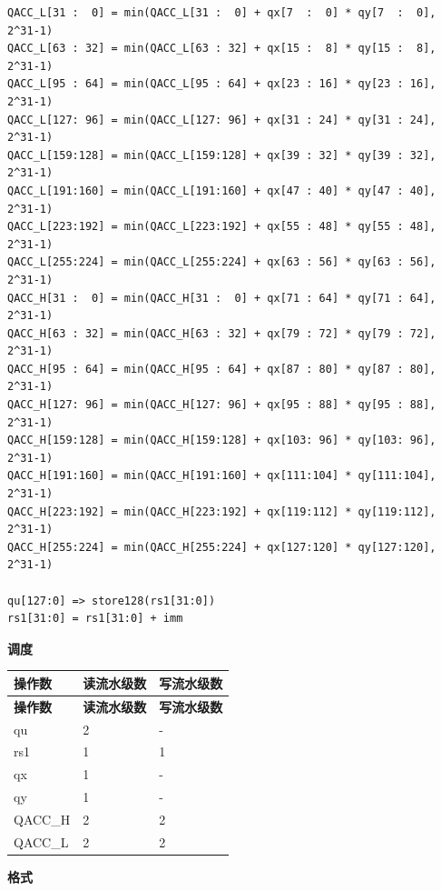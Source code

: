 \begin{lstlisting}
QACC_L[31 :  0] = min(QACC_L[31 :  0] + qx[7  :  0] * qy[7  :  0], 2^31-1)
QACC_L[63 : 32] = min(QACC_L[63 : 32] + qx[15 :  8] * qy[15 :  8], 2^31-1)
QACC_L[95 : 64] = min(QACC_L[95 : 64] + qx[23 : 16] * qy[23 : 16], 2^31-1)
QACC_L[127: 96] = min(QACC_L[127: 96] + qx[31 : 24] * qy[31 : 24], 2^31-1)
QACC_L[159:128] = min(QACC_L[159:128] + qx[39 : 32] * qy[39 : 32], 2^31-1)
QACC_L[191:160] = min(QACC_L[191:160] + qx[47 : 40] * qy[47 : 40], 2^31-1)
QACC_L[223:192] = min(QACC_L[223:192] + qx[55 : 48] * qy[55 : 48], 2^31-1)
QACC_L[255:224] = min(QACC_L[255:224] + qx[63 : 56] * qy[63 : 56], 2^31-1)
QACC_H[31 :  0] = min(QACC_H[31 :  0] + qx[71 : 64] * qy[71 : 64], 2^31-1)
QACC_H[63 : 32] = min(QACC_H[63 : 32] + qx[79 : 72] * qy[79 : 72], 2^31-1)
QACC_H[95 : 64] = min(QACC_H[95 : 64] + qx[87 : 80] * qy[87 : 80], 2^31-1)
QACC_H[127: 96] = min(QACC_H[127: 96] + qx[95 : 88] * qy[95 : 88], 2^31-1)
QACC_H[159:128] = min(QACC_H[159:128] + qx[103: 96] * qy[103: 96], 2^31-1)
QACC_H[191:160] = min(QACC_H[191:160] + qx[111:104] * qy[111:104], 2^31-1)
QACC_H[223:192] = min(QACC_H[223:192] + qx[119:112] * qy[119:112], 2^31-1)
QACC_H[255:224] = min(QACC_H[255:224] + qx[127:120] * qy[127:120], 2^31-1)

qu[127:0] => store128(rs1[31:0])
rs1[31:0] = rs1[31:0] + imm
\end{lstlisting}

\textbf{调度}\\
\begin{longtable}[c]{|l|l|l|}
    \hline
    \rowcolor{lightgray}
    \textbf{操作数} & \textbf{读流水级数} & \textbf{写流水级数} \\\hline
    \endfirsthead
    \hline
    \rowcolor{lightgray}
     \textbf{操作数} & \textbf{读流水级数} & \textbf{写流水级数} \\\hline
    \endhead
    \hline
    \endfoot

    qu & 2 & - \\\hline
    rs1 & 1 & 1 \\\hline
     qx & 1 & - \\\hline
     qy & 1 & - \\\hline
     QACC\_H & 2 & 2 \\\hline
     QACC\_L & 2 & 2

\end{longtable}

\textbf{格式}\\

